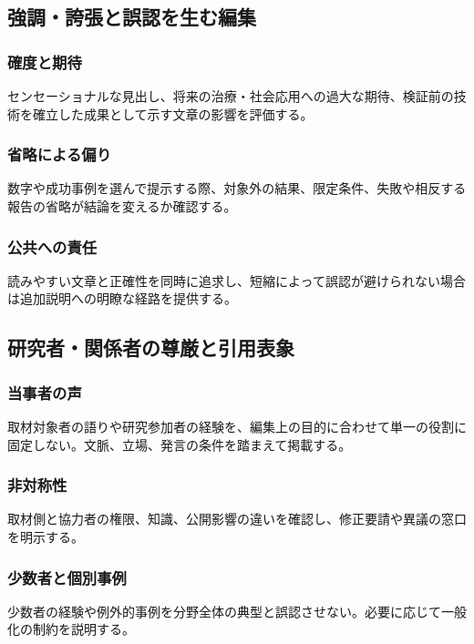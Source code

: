 \documentclass[a4paper,11pt]{article}
\begin{document}
\subsection{強調・誇張と誤認を生む編集}
\subsubsection{確度と期待}
\par センセーショナルな見出し、将来の治療・社会応用への過大な期待、検証前の技術を確立した成果として示す文章の影響を評価する。\par\medskip
\subsubsection{省略による偏り}
\par 数字や成功事例を選んで提示する際、対象外の結果、限定条件、失敗や相反する報告の省略が結論を変えるか確認する。\par\medskip
\subsubsection{公共への責任}
\par 読みやすい文章と正確性を同時に追求し、短縮によって誤認が避けられない場合は追加説明への明瞭な経路を提供する。\par\medskip
\subsection{研究者・関係者の尊厳と引用表象}
\subsubsection{当事者の声}
\par 取材対象者の語りや研究参加者の経験を、編集上の目的に合わせて単一の役割に固定しない。文脈、立場、発言の条件を踏まえて掲載する。\par\medskip
\subsubsection{非対称性}
\par 取材側と協力者の権限、知識、公開影響の違いを確認し、修正要請や異議の窓口を明示する。\par\medskip
\subsubsection{少数者と個別事例}
\par 少数者の経験や例外的事例を分野全体の典型と誤認させない。必要に応じて一般化の制約を説明する。\par\medskip
\end{document}
